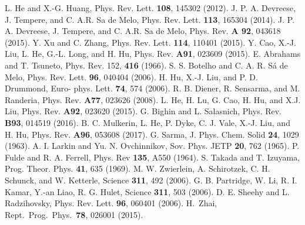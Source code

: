 \documentclass[aps,prd,amsmath,two column,nofootinbib,amssymb,referee]{revtex4}
\begin{document}
\begin{thebibliography}{99}
    L. He and X.-G. Huang, Phys. Rev. Lett. {\bf 108}, 145302 (2012).
    J. P. A. Devreese, J. Tempere, and C. A.R. Sa de Melo, Phys. Rev. Lett. {\bf 113}, 165304 (2014).
    J. P. A. Devreese, J. Tempere, and C. A.R. Sa de Melo, Phys. Rev. {\bf A 92}, 043618 (2015).
    Y. Xu and C. Zhang, Phys. Rev. Lett. {\bf 114}, 110401 (2015).
    Y. Cao, X.-J. Liu, L. He, G.-L. Long, and H. Hu, Phys. Rev. {\bf A91}, 023609 (2015).
    E. Abrahams and T. Tsuneto, Phys. Rev. 152, {\bf 416} (1966). 
     S. S. Botelho and C. A. R. S\'a de Melo, Phys. Rev. Lett. {\bf96}, 040404 (2006).
               H. Hu, X.-J. Liu, and P. D. Drummond, Euro- phys. Lett. {\bf74}, 574 (2006).
         R. B. Diener, R. Sensarma, and M. Randeria, Phys. Rev. {\bf A77}, 023626 (2008).
         L. He, H. Lu, G. Cao, H. Hu, and X.J. Liu, Phys. Rev. {\bf A92}, 023620 (2015).
         G. Bighin and L. Salasnich, Phys. Rev. {\bf B93}, 014519 (2016).
         B. C. Mulkerin, L. He, P. Dyke, C. J. Vale, X.-J. Liu, and H. Hu, Phys. Rev. {\bf A96}, 053608 (2017).
 G. Sarma, J. Phys. Chem. Solid {\bf24}, 1029 (1963).
 A. I. Larkin and Yu. N. Ovchinnikov, Sov. Phys. JETP {\bf20}, 762 (1965).
 P. Fulde and R. A. Ferrell, Phys. Rev {\bf135}, A550 (1964).
 S. Takada and T. Izuyama, Prog. Theor. Phys. {\bf41}, 635 (1969).
 M. W. Zwierlein, A. Schirotzek, C. H. Schunck, and W. Ketterle,  Science \textbf{311}, 492 (2006).
 G. B. Partridge, W. Li, R. I. Kamar, Y.-an Liao, R. G. Hulet, Science \textbf{311}, 503 (2006).
 D. E. Sheehy and L. Radzihovsky, Phys. Rev. Lett. \textbf{96}, 060401 (2006).
  H.~Zhai, Rept.\ Prog.\ Phys.\  {\bf 78}, 026001 (2015).



\end{thebibliography}
\end{document}
